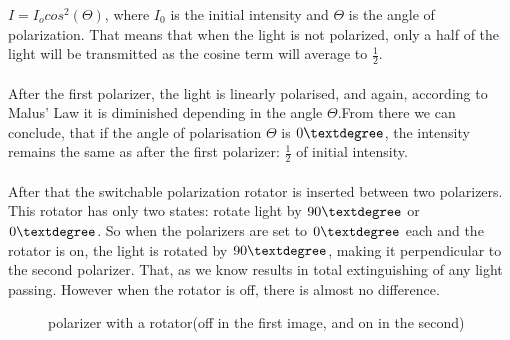 \documentclass[english]{article}
\begin{document}
$I=I_ocos^2(\Theta)$, where $I_0$ is the initial intensity and $\Theta$ is the angle of polarization.
That means that when the light is not polarized, only a half of the light will be transmitted as the cosine term will average to $\frac{1}{2}$.\\
\\
After the first polarizer, the light is linearly polarised, and again, according to Malus' Law it is diminished depending in the angle $\Theta$.From there we can conclude, that if the angle of polarisation $\Theta$ is $0\textdegree$, the intensity remains the same as after the first polarizer: $\frac{1}{2}$ of initial intensity. \\
\\
After that the switchable polarization rotator is inserted between two polarizers.
This rotator has only two states: rotate light by $90\textdegree$ or $0\textdegree$. 
So when the polarizers are set to $0\textdegree$ each and the rotator is on, the light is rotated by $90\textdegree$, making it perpendicular to the second polarizer. 
That, as we know results in total extinguishing of any light passing. 
However when the rotator is off, there is almost no difference.\\
\begin{figure}[H]
	\centering
	\caption{polarizer with a rotator(off in the first image, and on in the second)}
	\label{fig:seven}
\end{figure}
\end{document}
